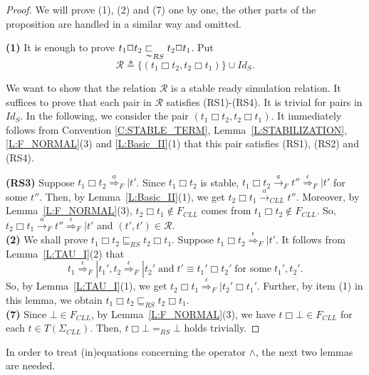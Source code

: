 \documentclass{elsarticle}
\theoremstyle{plain}
\theoremstyle{definition}
\begin{document}
\begin{proof}
    We will prove (1), (2) and (7) one by one, the other parts of the proposition are handled in a similar way and omitted.

   \noindent \textbf{(1)}
    It is enough to prove $t_1 \Box t_2 \underset{\thicksim}{\sqsubset}_{RS} t_2 \Box t_1$. Put
    \[{\mathcal R}\triangleq\{(t_1 \Box t_2 , t_2 \Box t_1)\} \cup Id_S .\]

    We want to show that the relation $\mathcal R$ is a stable ready simulation relation. It suffices to prove that each pair in $\mathcal R$ satisfies (RS1)-(RS4). It is trivial for pairs in $Id_S$. In the following, we consider the pair $(t_1 \Box t_2 , t_2 \Box t_1)$. It immediately follows from Convention \ref{C:STABLE_TERM}, Lemma~\ref{L:STABILIZATION}, \ref{L:F_NORMAL}(3) and \ref{L:Basic_II}(1) that this pair satisfies (RS1), (RS2) and (RS4).

    \textbf{(RS3)} Suppose $t_1 \Box t_2 \stackrel{a}{\Longrightarrow}_F| t'$.
    Since $t_1 \Box t_2$ is stable, $t_1 \Box t_2 \stackrel{a}{\longrightarrow}_F t''\stackrel{\epsilon}{\Longrightarrow}_F| t'$ for some $t''$.
    Then, by Lemma~\ref{L:Basic_II}(1),  we get $t_2 \Box t_1 \stackrel{a}{\longrightarrow}_{CLL} t''$.
    Moreover, by Lemma~\ref{L:F_NORMAL}(3), $t_2 \Box t_1 \notin F_{CLL}$ comes from $t_1 \Box t_2 \notin F_{CLL}$.
    So, $t_2 \Box t_1 \stackrel{a}{\longrightarrow}_F t''\stackrel{\epsilon}{\Longrightarrow}_F| t'$ and $(t',t')\in {\mathcal R}$.\\

    \noindent\textbf{(2)} We shall prove $t_1 \Box t_2 \sqsubseteq_{RS} t_2 \Box t_1$.
    Suppose $t_1 \Box t_2 \stackrel{\epsilon}{\Longrightarrow}_F| t'$.
    It follows from Lemma~\ref{L:TAU_I}(2) that
    \[t_1 \stackrel{\epsilon}{\Longrightarrow}_F| t_1',  t_2 \stackrel{\epsilon}{\Longrightarrow}_F| t_2'\;\text{and}\; t'\equiv t_1' \Box t_2'\; \text{for some}\; t_1',t_2'.\]
    So, by Lemma~\ref{L:TAU_I}(1), we get $t_2 \Box t_1 \stackrel{\epsilon}{\Longrightarrow}_F| t_2' \Box t_1'$. Further, by item (1) in this lemma, we obtain $t_1 \Box t_2 \sqsubseteq_{RS} t_2 \Box t_1$.\\

    \noindent \textbf{(7)} Since $\bot \in F_{{CLL}}$, by Lemma~\ref{L:F_NORMAL}(3), we have  $t \Box \bot \in F_{{CLL}}$ for each $t\in T(\Sigma_{CLL})$. Then, $t \Box \bot =_{RS} \bot$ holds trivially.
\end{proof}

In order to treat (in)equations concerning the operator $\wedge$, the next two lemmas are needed.
\end{document}
